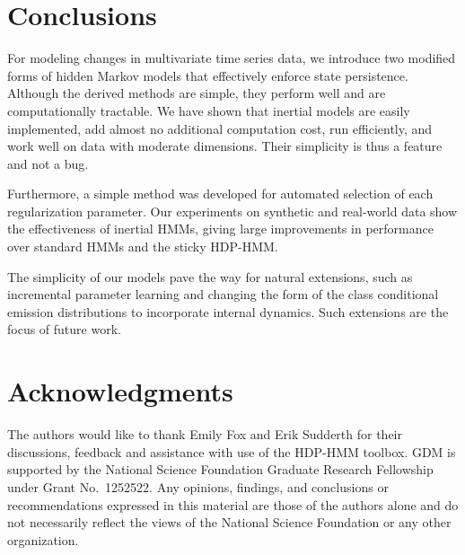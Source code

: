 \documentclass[letterpaper]{article}
\begin{document}
\section{Conclusions}

For modeling changes in multivariate time series data, we introduce two modified forms of hidden Markov models that effectively enforce state persistence. Although the derived methods are simple, they perform well and are computationally tractable. We have shown that inertial models are easily implemented, add almost no additional computation cost, run efficiently, and work well on data with moderate dimensions. Their simplicity is thus a feature and not a bug. 

Furthermore, a simple method was developed for automated selection of each regularization parameter. Our experiments on synthetic and real-world data show the effectiveness of inertial HMMs, giving large improvements in performance over standard HMMs and the sticky HDP-HMM.

The simplicity of our models pave the way for natural extensions, such as incremental parameter learning and changing the form of the class conditional emission distributions to incorporate internal dynamics. Such extensions are the focus of future work.

\section{Acknowledgments}
 The authors would like to thank Emily Fox and Erik Sudderth for their discussions, feedback and assistance with use of the HDP-HMM toolbox. GDM is supported by the National Science Foundation Graduate Research Fellowship under Grant No.\ 1252522. Any opinions, findings, and conclusions or recommendations expressed in this material are those of the authors alone and do not necessarily reflect the views of the National Science Foundation or any other organization.
\vspace{0.5cm}
\fontsize{9.5pt}{10.5pt}
\selectfont


\end{document}

